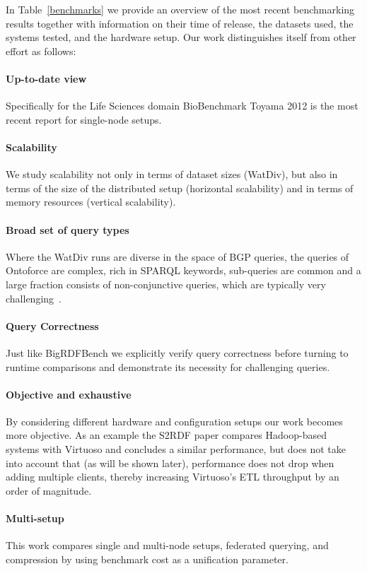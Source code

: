 In Table~\ref{benchmarks} we provide an overview of the most recent benchmarking results together with information on their time of release, the datasets used,
the systems tested, and the hardware setup. Our work distinguishes itself from other effort as follows:

\paragraph{Up-to-date view} Specifically for the Life Sciences domain BioBenchmark Toyama 2012 is the most recent report for single-node setups.

\paragraph{Scalability} We study scalability not only in terms of dataset sizes (WatDiv), but also in terms of the size of the distributed setup (horizontal scalability) and in terms of memory resources (vertical scalability).

\paragraph{Broad set of query types} Where the WatDiv runs are diverse in the space of BGP queries, the queries of Ontoforce are complex, rich in SPARQL keywords, sub-queries are common and a large fraction consists of non-conjunctive queries, which are typically very challenging~\cite{Picalausa2011}. 

\paragraph{Query Correctness} Just like BigRDFBench we explicitly verify query correctness before turning to runtime comparisons and demonstrate its necessity for challenging queries.

\paragraph{Objective and exhaustive} By considering different hardware and configuration setups our work becomes more objective. As an example the S2RDF paper compares Hadoop-based systems with Virtuoso and concludes a similar performance, but does not take into account that (as will be shown later), performance does not drop when adding multiple clients, thereby increasing Virtuoso's ETL throughput by an order of magnitude.

\paragraph{Multi-setup} This work compares single and multi-node setups, federated querying, and compression by using benchmark cost as a unification parameter.

